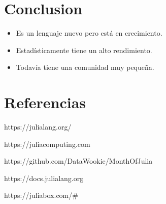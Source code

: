 \documentclass[11pt]{article}
\begin{document}
    \section{Conclusion}\label{conclusion}

    \begin{itemize}
\item
  Es un lenguaje nuevo pero está en crecimiento.
\item
  Estadísticamente tiene un alto rendimiento.
\item
  Todavía tiene una comunidad muy pequeña.
\end{itemize}

    \section{Referencias}\label{referencias}

    https://julialang.org/

https://juliacomputing.com

https://github.com/DataWookie/MonthOfJulia

https://docs.julialang.org

https://juliabox.com/\#


    
    
    
    
\end{document}
